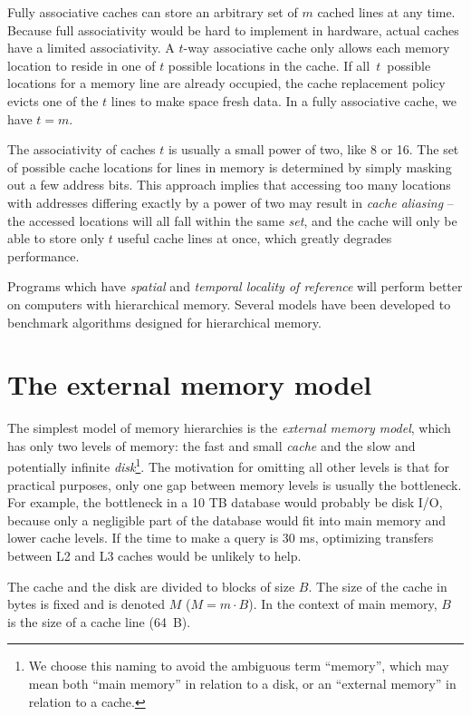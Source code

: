 Fully associative caches can store an arbitrary set of $m$ cached lines
at any time. Because full associativity would be hard to implement in hardware,
actual caches have a limited associativity. A $t$-way associative
cache only allows each memory location to reside in one of $t$ possible
locations in the cache. If all~$t$~possible locations for a memory line
are already occupied, the cache replacement policy evicts one of the $t$
lines to make space fresh data. In a fully associative cache, we have $t=m$.

The associativity of caches $t$ is usually a small power of two, like 8 or 16.
The set of possible cache locations for lines in memory is determined
by simply masking out a few address bits. This approach implies that
accessing too many locations with addresses differing exactly by a power
of two may result in \emph{cache aliasing} -- the accessed locations will
all fall within the same \emph{set}, and the cache will only be able
to store only $t$ useful cache lines at once, which greatly degrades
performance.

Programs which have \emph{spatial} and \emph{temporal locality of reference}
will perform better on computers with hierarchical memory. Several models have
been developed to benchmark algorithms designed for hierarchical memory.

\section{The external memory model}
The simplest model of memory hierarchies is the \emph{external memory model},
which has only two levels of memory: the fast and small \emph{cache} and the
slow and potentially infinite \emph{disk}\footnote{%
	We choose this naming to avoid the ambiguous term ``memory'',
	which may mean both ``main memory'' in relation to a disk,
	or an ``external memory'' in relation to a cache.
}. The motivation for omitting all other levels is that for practical purposes,
only one gap between memory levels is usually the bottleneck. For example,
the bottleneck in a 10 TB database would probably be disk I/O, because
only a negligible part of the database would fit into main memory and
lower cache levels. If the time to make a query is 30 ms, optimizing transfers
between L2 and L3 caches would be unlikely to help.

The cache and the disk are divided to blocks of size $B$. The size of the cache 
in bytes is fixed and is denoted $M$ ($M=m\cdot B$).
In the context of main memory, $B$ is the size of a cache line (64~B).

